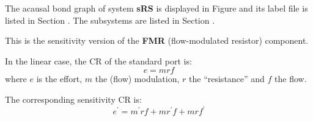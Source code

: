

   The acausal bond graph of system \textbf{sRS} is
   displayed in Figure  and its label
   file is listed in Section .
   The subsystems are listed in Section .


This is the sensitivity version of the \textbf{FMR} (flow-modulated
resistor) component.

In the linear case, the CR of the standard port is:
\begin{equation}
  e = mrf
\end{equation}
where $e$ is the effort, $m$ the (flow) modulation, $r$ the
``resistance'' and $f$ the flow.

The corresponding sensitivity CR is:
\begin{equation}
  e^\prime  = m^\prime rf + mr^\prime f + mrf^\prime
\end{equation}